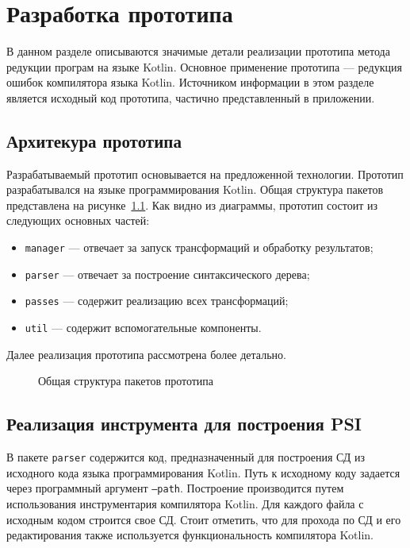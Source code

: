 \chapter{Разработка прототипа}
В данном разделе описываются значимые детали реализации прототипа метода редукции програм на языке Kotlin. Основное применение прототипа --- редукция ошибок компилятора языка Kotlin. Источником информации в этом разделе является исходный код прототипа, частично представленный в приложении.
\section{Архитекура прототипа}
Разрабатываемый прототип основывается на предложенной технологии. Прототип разрабатывался на языке программирования Kotlin. Общая структура пакетов представлена на рисунке~\ref{packages}. Как видно из диаграммы, прототип состоит из следующих основных частей:
\begin{itemize}
	\item \texttt{manager} --- отвечает за запуск трансформаций и обработку результатов;
	\item \texttt{parser} --- отвечает за построение синтаксического дерева;
	\item \texttt{passes} --- содержит реализацию всех трансформаций;
	\item \texttt{util} --- содержит вспомогательные компоненты.
\end{itemize}
Далее реализация прототипа рассмотрена более детально.

\begin{figure}
\caption{\label{packages}Общая структура пакетов прототипа}
\end{figure}

\section{Реализация инструмента для построения PSI}
В пакете \texttt{parser} содержится код, предназначенный для построения СД из исходного кода языка программирования Kotlin. Путь к исходному коду задается через программный аргумент \texttt{--path}. Построение производится путем использования инструментария компилятора Kotlin. Для каждого файла с исходным кодом строится свое СД. Стоит отметить, что для прохода по СД и его редактирования также используется функциональность компилятора Kotlin.


